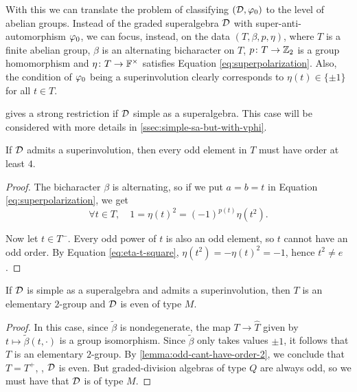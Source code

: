 With this we can translate the problem of classifying $(\mathcal{D}, \varphi_0)$ to the level of abelian groups.
Instead of the graded superalgebra $\mathcal{D}$ with super-anti-automorphism $\varphi_0$, we can focus, instead, on the data $(T, \beta, p, \eta)$, where $T$ is a finite abelian group, $\beta$ is an alternating bicharacter on $T$, $p\colon T \to \mathbb{Z}_2$ is a group homomorphism and $\eta\colon T \to \mathbb{F}^\times$ satisfies Equation \eqref{eq:superpolarization}.
Also, the condition of $\varphi_0$ being a superinvolution clearly corresponds to $\eta(t) \in \{ \pm 1 \}$ for all $t\in T$. 

 gives a strong restriction if $\mathcal{D}$ simple as a superalgebra. 
This case will be considered with more details in \cref{ssec:simple-sa-but-with-vphi}.

\begin{lemma}\label{lemma:odd-cant-have-order-2}
	If $\mathcal{D}$ admits a superinvolution, %
	then every odd element in $T$ must have order at least $4$.
\end{lemma}

\begin{proof}
	The bicharacter $\beta$ is alternating, so if we put $a = b = t$ in Equation \eqref{eq:superpolarization}, we get
	\begin{equation}\label{eq:eta-t-square}
		\forall t\in T, \quad 1 = \eta(t)^2 = (-1)^{p(t)} \eta(t^2).
	\end{equation}

	Now let $t\in T^-$.
	Every odd power of $t$ is also an odd element, so $t$ cannot have an odd order.
	By Equation \eqref{eq:eta-t-square}, $\eta (t^2) = - \eta(t)^2 = -1$, hence $t^2 \neq e$.
\end{proof}

\begin{cor}\label{cor:sinv-implies-type-M}
    If $\mathcal{D}$ is simple as a superalgebra and admits a superinvolution, then $T$ is an elementary $2$-group and 
    $\mathcal{D}$ is even of type $M$.
\end{cor}

\begin{proof}
    In this case, since $\tilde\beta$ is nondegenerate, the map $T \to \widehat T$ given by $t \mapsto \tilde\beta(t, \cdot)$ is a group isomorphism. 
    Since $\tilde\beta$ only takes values $\pm 1$, it follows that $T$ is an elementary $2$-group. 
    By \cref{lemma:odd-cant-have-order-2}, we conclude that $T = T^+$, \ie, $\mathcal{D}$ is even. 
    But graded-division algebras of type $Q$ are always odd, so we must have that $\mathcal{D}$ is of type $M$. 
\end{proof}

